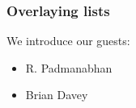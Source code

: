 \documentclass{beamer}
\begin{document}
\begin{frame}
\frametitle{Overlaying lists}

We introduce our guests:
\begin{itemize}
\item<1-> R. Padmanabhan
\item<2-> Brian Davey
\end{itemize}
\end{frame}
\end{document}
